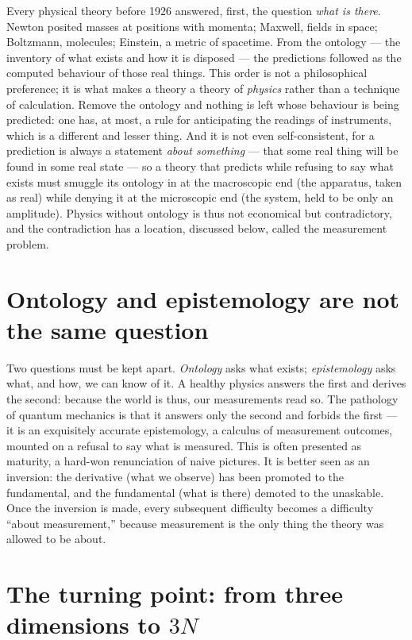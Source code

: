 \documentclass[11pt]{article}
\begin{document}
Every physical theory before 1926 answered, first, the question \emph{what is there}. Newton posited masses at
positions with momenta; Maxwell, fields in space; Boltzmann, molecules; Einstein, a metric of spacetime. From
the ontology --- the inventory of what exists and how it is disposed --- the predictions followed as the computed
behaviour of those real things. This order is not a philosophical preference; it is what makes a theory a theory
of \emph{physics} rather than a technique of calculation. Remove the ontology and nothing is left whose behaviour
is being predicted: one has, at most, a rule for anticipating the readings of instruments, which is a different
and lesser thing. And it is not even self-consistent, for a prediction is always a statement \emph{about
something} --- that some real thing will be found in some real state --- so a theory that predicts while refusing
to say what exists must smuggle its ontology in at the macroscopic end (the apparatus, taken as real) while
denying it at the microscopic end (the system, held to be only an amplitude). Physics without ontology is thus
not economical but contradictory, and the contradiction has a location, discussed below, called the measurement
problem.

\section{Ontology and epistemology are not the same question}

Two questions must be kept apart. \emph{Ontology} asks what exists; \emph{epistemology} asks what, and how, we
can know of it. A healthy physics answers the first and derives the second: because the world is thus, our
measurements read so. The pathology of quantum mechanics is that it answers only the second and forbids the
first --- it is an exquisitely accurate epistemology, a calculus of measurement outcomes, mounted on a refusal to
say what is measured. This is often presented as maturity, a hard-won renunciation of naive pictures. It is
better seen as an inversion: the derivative (what we observe) has been promoted to the fundamental, and the
fundamental (what is there) demoted to the unaskable. Once the inversion is made, every subsequent difficulty
becomes a difficulty ``about measurement,'' because measurement is the only thing the theory was allowed to be
about.

\section{The turning point: from three dimensions to \texorpdfstring{$3N$}{3N}}
\end{document}
